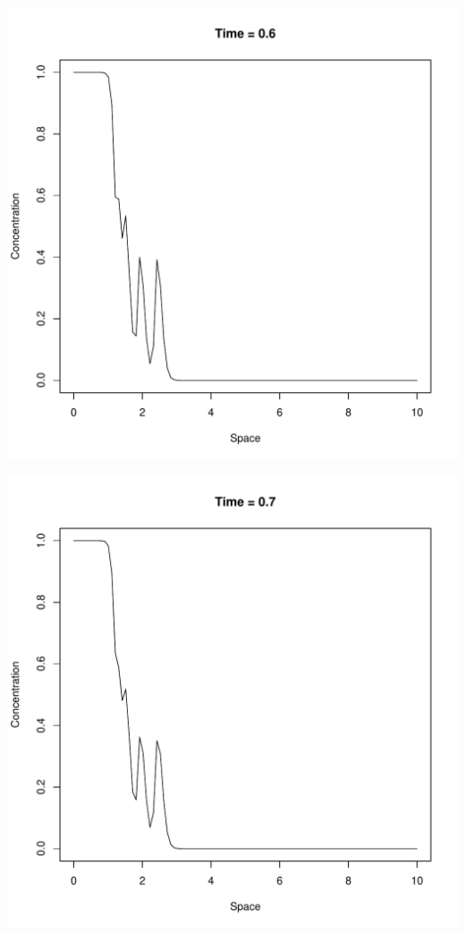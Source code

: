 \documentclass{tufte-handout}\usepackage[]{graphicx}\usepackage[]{xcolor}
\makeatletter
\def\maxwidth{ %
  \ifdim\Gin@nat@width>\linewidth
    \linewidth
  \else
    \Gin@nat@width
  \fi
}
\newenvironment{knitrout}{}{} %
\makeatother
\begin{document}
\begin{knitrout}
\includegraphics[width=\maxwidth]{figure/unnamed-chunk-2-7} 

\includegraphics[width=\maxwidth]{figure/unnamed-chunk-2-8} 


\end{knitrout}
\end{document}
